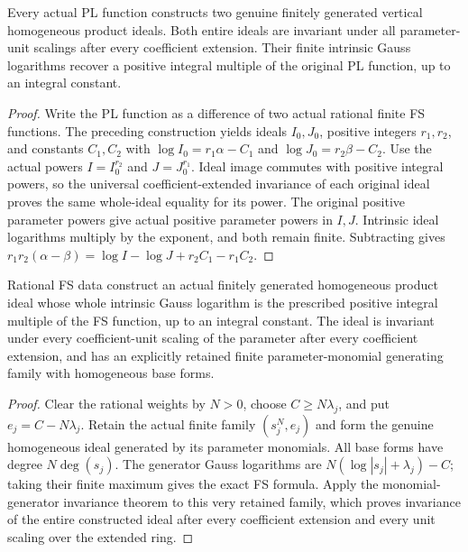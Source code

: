 \begin{lemma}
\label{lem:pl-invariant-vertical-ideals}
\leanok
Every actual PL function constructs two genuine finitely generated vertical
homogeneous product ideals.  Both entire ideals are invariant under all
parameter-unit scalings after every coefficient extension.  Their finite
intrinsic Gauss logarithms recover a positive integral multiple of the
original PL function, up to an integral constant.
\end{lemma}
\begin{proof}
Write the PL function as a difference of two actual rational finite FS
functions.  The preceding construction yields ideals $I_0,J_0$, positive
integers $r_1,r_2$, and constants $C_1,C_2$ with
$\log I_0=r_1\alpha-C_1$ and $\log J_0=r_2\beta-C_2$.
Use the actual powers $I=I_0^{r_2}$ and $J=J_0^{r_1}$.
Ideal image commutes with positive integral powers, so the universal
coefficient-extended invariance of each original ideal proves the same
whole-ideal equality for its power.  The original positive parameter powers
give actual positive parameter powers in $I,J$.  Intrinsic ideal logarithms
multiply by the exponent, and both remain finite.  Subtracting gives
$r_1r_2(\alpha-\beta)=\log I-\log J+r_2C_1-r_1C_2$.
\end{proof}

\begin{lemma}
\label{lem:pl-fs-invariant-product-ideal}
\leanok
Rational FS data construct an actual finitely generated homogeneous
product ideal whose whole intrinsic Gauss logarithm is the prescribed
positive integral multiple of the FS function, up to an integral constant.
The ideal is invariant under every coefficient-unit scaling of the
parameter after every coefficient extension, and has an explicitly
retained finite parameter-monomial generating family with homogeneous
base forms.
\end{lemma}
\begin{proof}
Clear the rational weights by $N>0$, choose $C\ge N\lambda_j$, and put
$e_j=C-N\lambda_j$.  Retain the actual finite family
$(s_j^N,e_j)$ and form the genuine homogeneous ideal generated by its
parameter monomials.  All base forms have degree $N\deg(s_j)$.
The generator Gauss logarithms are
$N(\log|s_j|+\lambda_j)-C$; taking their finite maximum gives the exact
FS formula.  Apply the monomial-generator invariance theorem
to this very retained family, which proves invariance of the entire
constructed ideal after every coefficient extension and every unit
scaling over the extended ring.
\end{proof}

